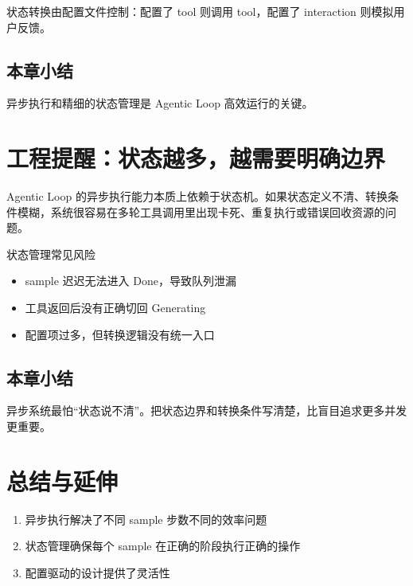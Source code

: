 \documentclass[a4paper]{article}
\begin{document}
状态转换由配置文件控制：配置了 tool 则调用 tool，配置了 interaction 则模拟用户反馈。

\subsection{本章小结}
异步执行和精细的状态管理是 Agentic Loop 高效运行的关键。

\newpage
\section{工程提醒：状态越多，越需要明确边界}
Agentic Loop 的异步执行能力本质上依赖于状态机。如果状态定义不清、转换条件模糊，系统很容易在多轮工具调用里出现卡死、重复执行或错误回收资源的问题。

\begin{warningbox}{状态管理常见风险}
\begin{itemize}
  \item sample 迟迟无法进入 Done，导致队列泄漏
  \item 工具返回后没有正确切回 Generating
  \item 配置项过多，但转换逻辑没有统一入口
\end{itemize}
\end{warningbox}

\subsection{本章小结}
异步系统最怕“状态说不清”。把状态边界和转换条件写清楚，比盲目追求更多并发更重要。

\newpage
\section{总结与延伸}
\begin{enumerate}
  \item 异步执行解决了不同 sample 步数不同的效率问题
  \item 状态管理确保每个 sample 在正确的阶段执行正确的操作
  \item 配置驱动的设计提供了灵活性
\end{enumerate}
\end{document}
